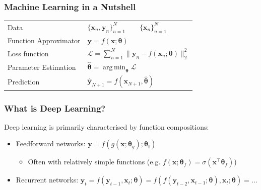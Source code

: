 \documentclass[]{article}
\DeclareMathOperator*{\argmin}{arg\,min}
\begin{document}
\begin{frame}
\frametitle{Machine Learning in a Nutshell}
\vspace{5mm}
\begin{tabular}{ll}
Data & $\{\bm{x}_n, \bm{y}_n\}^N_{n=1} \qquad \{\bm{x}_n\}^N_{n=1}$
\vspace{3mm} \\ \pause
Function Approximator & $\bm{y} = f (\bm{x}; \bm{\theta})$ %
\vspace{3mm} \\ \pause
Loss function & $\mathcal{L} = \sum^N_{n=1} \|\bm{y}_n - f (\bm{x}_n; \bm{\theta})\|^2_2$
\vspace{3mm} \\ \pause
Parameter Estimation & $\displaystyle \bm{\hat \theta} = \argmin_{\bm{\theta}} \mathcal{L}$
\vspace{3mm} \\ \pause
Prediction & $\bm{\hat y}_{N+1} = f(\bm{x}_{N+1}, \bm{\hat \theta})$
\end{tabular}
\vspace{5mm}
\end{frame}

\begin{frame}
\frametitle{What is Deep Learning?}

Deep learning is primarily characterised by function compositions: \\ \vspace{10mm}
\begin{itemize}
	\item<2-> Feedforward networks: $\bm{y} = f (g(\bm{x}; \bm\theta_g); \bm{\theta_f})$
	\begin{itemize}
		\item Often with relatively simple functions (e.g. $f(\bm x; \bm{\theta}_f) = \sigma(\bm{x}^\top \bm{\theta}_f)$)
	\end{itemize} \vspace{3mm}
	\item<3-> Recurrent networks: $\bm y_t = f(\bm y_{t-1}, \bm x_t; \bm\theta) = f(f(\bm y_{t-2}, \bm x_{t-1}; \bm\theta), \bm x_t; \bm\theta) = \dots$
\end{itemize}
\vspace{10mm}

\end{frame}
\end{document}
